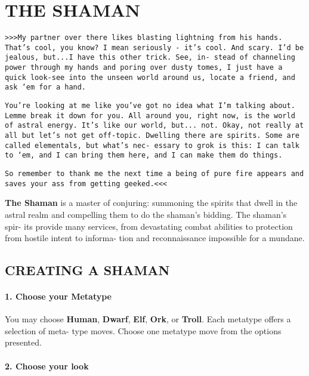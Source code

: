 
\section{THE SHAMAN}
\begin{multicols}{3}
\setlength{\parskip}{.05cm}

\texttt{>>>My partner over there likes blasting lightning from his
hands. That’s cool, you know? I mean seriously - it’s cool.
And scary. I’d be jealous, but...I have this other trick. See, in-
stead of channeling power through my hands and poring
over dusty tomes, I just have a quick look-see into the unseen
world around us, locate a friend, and ask ‘em for a hand.}

\texttt{You’re looking at me like you’ve got no idea what I’m talking
about. Lemme break it down for you. All around you, right
now, is the world of astral energy. It’s like our world, but...
not. Okay, not really at all but let’s not get off-topic. Dwelling
there are spirits. Some are called elementals, but what’s nec-
essary to grok is this: I can talk to ‘em, and I can bring them
here, and I can make them do things.}

\texttt{So remember to thank me the next time a being of pure fire
appears and saves your ass from getting geeked.<<<}

\textbf{The Shaman} is a master of conjuring: summoning the
spirits that dwell in the astral realm and compelling
them to do the shaman’s bidding. The shaman’s spir-
its provide many services, from devastating combat
abilities to protection from hostile intent to informa-
tion and reconnaissance impossible for a mundane.



\subsection{CREATING A SHAMAN}

\paragraph{1.  Choose your Metatype}

You may choose \textbf{Human}, \textbf{Dwarf}, \textbf{Elf}, \textbf{Ork}, or
\textbf{Troll}. Each metatype offers a selection of meta-
type moves. Choose one metatype move from
the options presented.

\paragraph{2.  Choose your look}


\end{multicols}
